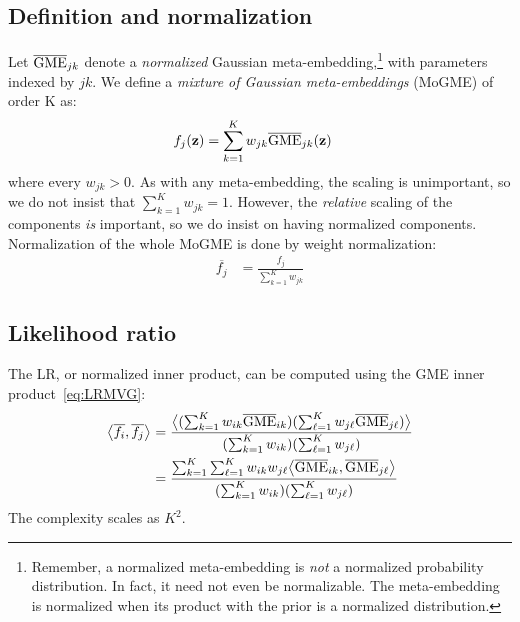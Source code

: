 \documentclass[a4paper,oneside,12pt,english]{report}
\def\zvec{\mathbf{z}}
\def\expv#1#2{\bigl\langle#1\bigr\rangle_{#2}}
\def\expp#1{\bigl\langle#1\bigr\rangle}
\def\dot#1#2{\expv{#1,#2}{}}
\def\normal#1{\overline{#1}}
\def\dotn#1#2{\dot{\normal{#1}}{\normal{#2}}}
\begin{document}
\subsection{Definition and normalization}
Let $\nGME_{jk}$ denote a \emph{normalized} Gaussian meta-embedding,\footnote{Remember, a normalized meta-embedding is \emph{not} a normalized probability distribution. In fact, it need not even be normalizable. The meta-embedding is normalized when its product with the prior is a normalized distribution.} with parameters indexed by $jk$. We define a \emph{mixture of Gaussian meta-embeddings} (MoGME) of order K as:
\begin{align}
f_j(\zvec) &= \sum_{k=1}^K w_{jk} \nGME_{jk}(\zvec)
\end{align} 
where every $w_{jk}>0$. As with any meta-embedding, the scaling is unimportant, so we do not insist that $\sum_{k=1}^Kw_{jk}=1$. However, the \emph{relative} scaling of the components \emph{is} important, so we do insist on having normalized components. Normalization of the whole MoGME is done by weight normalization:
\begin{align}
\normal{f_j} &= \frac{f_j}{\sum_{k=1}^Kw_{jk}}
\end{align}

\subsection{Likelihood ratio}
The LR, or normalized inner product, can be computed using the GME inner product~\eqref{eq:LRMVG}: 
\begin{align}
\begin{split}
\dotn{f_i}{f_j} &= \frac{\expp{(\sum_{k=1}^K w_{ik}\nGME_{ik})(\sum_{\ell=1}^K w_{j\ell}\nGME_{j\ell})}}{(\sum_{k=1}^K w_{ik})(\sum_{\ell=1}^K w_{j\ell})}\\
&= \frac{\sum_{k=1}^K\sum_{\ell=1}^K w_{ik}w_{j\ell}\dot{\nGME_{ik}}{\nGME_{j\ell}}}{(\sum_{k=1}^K w_{ik})(\sum_{\ell=1}^K w_{j\ell})}
\end{split}
\end{align}
The complexity scales as $K^2$.
\end{document}
